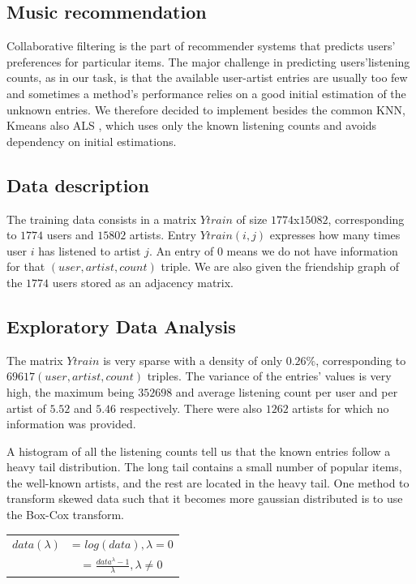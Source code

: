 \subsection{Music recommendation}
Collaborative filtering is the part of recommender systems that predicts users' preferences for particular items. The major challenge in predicting users'listening counts, as in our task, is that the available user-artist entries are usually too few and sometimes a method's performance relies on a good initial estimation of the unknown entries. 
We therefore decided to implement besides the common KNN, Kmeans also ALS \cite{Zhou:2008}, which uses only the known listening counts and avoids dependency on initial estimations.

\subsection{Data description}
The training data consists in a matrix $Ytrain$ of size $1774$x$15082$, corresponding to $1774$ users and $15802$ artists. Entry $Ytrain(i,j)$ expresses how many times user $i$ has listened to artist $j$. An entry of 0 means we do not have information for that $(user, artist, count)$ triple. We are also given the friendship graph of the $1774$ users stored as an adjacency matrix.

\subsection{Exploratory Data Analysis}

The matrix $Ytrain$ is very sparse with a density of only $0.26\%$, corresponding to $69617 (user, artist, count)$ triples. 
The variance of the entries' values is very high, the maximum  being $352698$ and average listening count per user and per artist of $5.52$ and $5.46$ respectively. There were also $1262$ artists for which no information was provided.

A histogram of all the listening counts tell us that the known entries follow a heavy tail distribution. The long tail contains a small number of popular items, the well-known artists, and the rest are located in the heavy tail. One method to transform skewed data such that it becomes more gaussian distributed is to use the Box-Cox transform.
\\
\begin{table}[h]
  \centering
  \begin{tabular}{c  c }
  $data(\lambda)$&= $log(data), \lambda = 0$ \\ 
                            &= $\frac{data^\lambda - 1}{\lambda} ,\lambda \neq 0$ \\ 
  \end{tabular}
\end{table}


